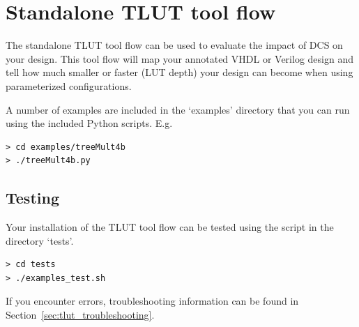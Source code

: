 \documentclass[a4paper,oneside]{memoir}
\begin{document}
\clearpage
\chapter{Standalone TLUT tool flow}\label{sec:standalone_flow}
The standalone TLUT tool flow can be used to evaluate the impact of DCS on your design. This tool flow will map your annotated VHDL or Verilog design and tell how much smaller or faster (LUT depth) your design can become when using parameterized configurations.

A number of examples are included in the `examples' directory that you can run using the included Python scripts.
E.g.
\begin{lstlisting}
> cd examples/treeMult4b
> ./treeMult4b.py
\end{lstlisting}

\section{Testing}\label{sec:tlut_testing}
Your installation of the TLUT tool flow can be tested using the script in the directory `tests'.
\begin{lstlisting}
> cd tests
> ./examples_test.sh
\end{lstlisting}
If you encounter errors, troubleshooting information can be found in Section~\ref{sec:tlut_troubleshooting}.
\end{document}
